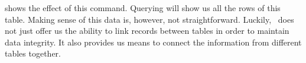  shows the effect of this command.
Querying  will show us all the rows of this table.
Making sense of this data is, however, not straightforward.
Luckily, \sql\ does not just offer us the ability to link records between tables in order to maintain data integrity.
It also provides us means to connect the information from different tables together.%
%
\endhsection%
\FloatBarrier%
\endhsection%
%
